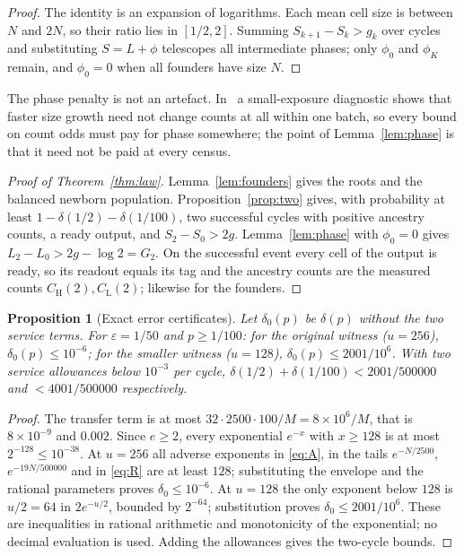 \documentclass[11pt,a4paper]{article}
\theoremstyle{plain}
\newtheorem{proposition}[theorem]{Proposition}
\theoremstyle{definition}
\theoremstyle{remark}
\newcommand{\eps}{\varepsilon}
\newcommand{\lo}{\mathrm L}
\newcommand{\hi}{\mathrm H}
\begin{document}
\begin{proof}
The identity is an expansion of logarithms. Each mean cell size is between $N$ and $2N$, so their ratio lies in $[1/2,2]$. Summing $S_{k+1}-S_k>g_k$ over cycles and substituting $S=L+\phi$ telescopes all intermediate phases; only $\phi_0$ and $\phi_K$ remain, and $\phi_0=0$ when all founders have size $N$.
\end{proof}

The phase penalty is not an artefact. In~\citep{batch2026} a small-exposure diagnostic shows that faster size growth need not change counts at all within one batch, so every bound on count odds must pay for phase somewhere; the point of Lemma~\ref{lem:phase} is that it need not be paid at every census.

\begin{proof}[Proof of Theorem~\ref{thm:law}]
Lemma~\ref{lem:founders} gives the roots and the balanced newborn population. Proposition~\ref{prop:two} gives, with probability at least $1-\delta(1/2)-\delta(1/100)$, two successful cycles with positive ancestry counts, a ready output, and $S_2-S_0>2g$. Lemma~\ref{lem:phase} with $\phi_0=0$ gives $L_2-L_0>2g-\log2=G_2$. On the successful event every cell of the output is ready, so its readout equals its tag and the ancestry counts are the measured counts $C_\hi(2),C_\lo(2)$; likewise for the founders.
\end{proof}

\begin{proposition}[Exact error certificates]\label{prop:exact}
Let $\delta_0(p)$ be $\delta(p)$ without the two service terms. For $\eps=1/50$ and $p\ge1/100$: for the original witness ($u=256$), $\delta_0(p)\le10^{-6}$; for the smaller witness ($u=128$), $\delta_0(p)\le2001/10^{6}$. With two service allowances below $10^{-3}$ per cycle, $\delta(1/2)+\delta(1/100)<2001/500000$ and $<4001/500000$ respectively.
\end{proposition}

\begin{proof}
The transfer term is at most $32\cdot2500\cdot100/M=8\times10^{6}/M$, that is $8\times10^{-9}$ and $0.002$. Since $e\ge2$, every exponential $e^{-x}$ with $x\ge128$ is at most $2^{-128}\le10^{-38}$. At $u=256$ all adverse exponents in \eqref{eq:A}, in the tails $e^{-N/2500}$, $e^{-19N/500000}$ and in \eqref{eq:R} are at least $128$; substituting the envelope and the rational parameters proves $\delta_0\le10^{-6}$. At $u=128$ the only exponent below $128$ is $u/2=64$ in $2e^{-u/2}$, bounded by $2^{-64}$; substitution proves $\delta_0\le2001/10^{6}$. These are inequalities in rational arithmetic and monotonicity of the exponential; no decimal evaluation is used. Adding the allowances gives the two-cycle bounds.
\end{proof}
\end{document}
